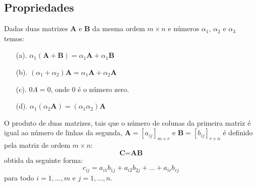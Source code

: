 \subsection*{Propriedades}
Dadas duas matrizes $\textbf{A}$ e $\textbf{B}$ da mesma ordem $m\times n$ e números $\alpha_{1}$, $\alpha_{2}$ e $\alpha_{3}$ temos: 
\begin{itemize}
	\item[(a).] $\alpha_{1} (\textbf{A}+\textbf{B})= \alpha_{1} \textbf{A}+ \alpha_{1} \textbf{B}$ 
	\item[(b).] $(\alpha_{1}+\alpha_{2})\textbf{A}=\alpha_{1}\textbf{A}+\alpha_{2}\textbf{A}$
	\item[(c).] $0A=0$, onde $0$ é o número zero.
	\item[(d).] $\alpha_{1}(\alpha_{2}\textbf{A})=(\alpha_{1}\alpha_{2})\textbf{A}$ 
\end{itemize}
\begin{df}
	O produto de duas matrizes,  tais que o número de colunas da primeira matriz é igual ao
	número de linhas da segunda, $\textbf{A}=[a_{ij}]_{m\times r}$ e $\textbf{B}=[b_{ij}]_{r\times n}$ é definido pela matriz de ordem $m\times n$:\\
	\begin{equation*}
	\textbf{C}=\textbf{A}\textbf{B}
	\end{equation*}
	obtida da seguinte forma:\\
	\begin{equation*}
	c_{ij}=a_{i1}b_{1j}+ a_{i2}b_{2j}+...+a_{ir}b_{rj} 
	\end{equation*}
	para todo $i=1,...,m$ e $j=1,...,n$.
\end{df}
